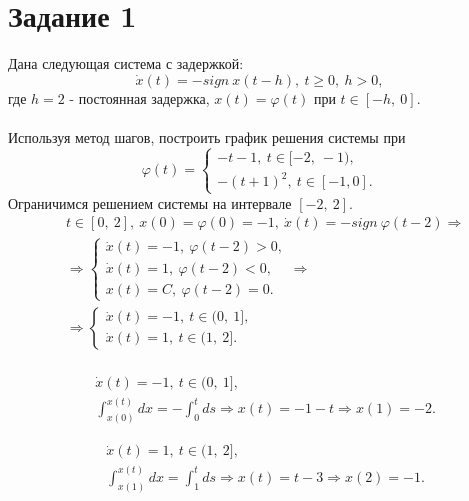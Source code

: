 \documentclass[12pt]{article}
\begin{document}
\section*{Задание 1}
Дана следующая система с задержкой:
\[
    \dot{x}(t) = -sign \ x(t-h), \ t \geq 0, \ h > 0,
\]
где $h = 2$ - постоянная задержка, $x(t) = \varphi(t)$ при $t \in [-h, \ 0]$. \\
\ \\
Используя метод шагов, построить график решения системы при
\[
    \varphi(t) = \begin{cases}
                    -t-1, \ t \in [-2, \ -1), \\
                    -(t+1)^2, \ t \in [-1, 0].
              \end{cases}
\]
Ограничимся решением системы на интервале $[-2, \ 2]$. \\
\begin{equation*}
    \begin{split}
        & t \in [0, \ 2], \ x(0) = \varphi(0) = -1, \ \dot{x}(t) = -sign \ \varphi(t-2) \Rightarrow \\
        & \Rightarrow \begin{cases} \dot{x}(t) = -1, \ \varphi(t-2) > 0, \\ \dot{x}(t) = 1, \ \varphi(t-2) < 0, \\ x(t) = C, \ \varphi(t-2) = 0. \end{cases} \Rightarrow \\
    & \Rightarrow \begin{cases} \dot{x}(t) = -1, \ t \in (0, \ 1], \\ \dot{x}(t) = 1, \ t \in (1, \ 2]. \end{cases} \\
    \end{split}
\end{equation*}

\begin{equation*}
    \begin{split}
        & \dot{x}(t) = -1, \ t \in (0, \ 1], \\
        & \int_{x(0)}^{x(t)} dx = - \int_0^t ds \Rightarrow x(t) = -1 - t \Rightarrow x(1)=-2.
    \end{split}
\end{equation*}

\begin{equation*}
    \begin{split}
        & \dot{x}(t) = 1, \ t \in (1, \ 2], \\
        & \int_{x(1)}^{x(t)} dx = \int_1^t ds \Rightarrow x(t) = t-3 \Rightarrow x(2)=-1.
    \end{split}
\end{equation*}
\end{document}
